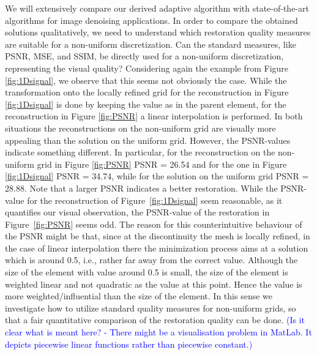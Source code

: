 \documentclass[enabledeprecatedfontcommands,cleardoublepage=empty,headsepline,twoside,11pt,DIV=15,BCOR=12mm,final]{scrartcl}
\begin{document}
We will extensively compare our derived adaptive algorithm with state-of-the-art algorithms for image denoising applications. In order to compare the obtained solutions qualitatively, we need to understand which restoration quality measures are suitable for a non-uniform discretization. Can the standard measures, like PSNR, MSE, and SSIM, be directly used for a non-uniform discretization, representing the visual quality? Considering again the example from Figure \ref{fig:1Dsignal}, we observe that this seems not obviously the case. While the transformation onto the locally refined grid for the reconstruction in Figure \ref{fig:1Dsignal} is done by keeping the value as in the parent element, for the reconstruction in Figure \ref{fig:PSNR} a linear interpolation is performed. In both situations the reconstructions on the non-uniform grid are visually more appealing than the solution on the uniform grid. However, the PSNR-values indicate something different. In particular, for the reconstruction on the non-uniform grid in Figure \ref{fig:PSNR} PSNR = 26.54 and for the one in Figure \ref{fig:1Dsignal} PSNR = 34.74, while for the solution on the uniform grid PSNR = 28.88. Note that a larger PSNR indicates a better restoration. While the PSNR-value for the reconstruction of Figure~\ref{fig:1Dsignal} seem reasonable, as it quantifies our visual observation, the PSNR-value of the restoration in Figure~\ref{fig:PSNR} seems odd. The reason for this counterintuitive behaviour of the PSNR might be that, since at the discontinuity the mesh is locally refined, in the case of linear interpolation there the minimization process aims at a solution which is around 0.5, i.e., rather far away from the correct value. Although the size of the element with value around 0.5 is small, the size of the element is weighted linear and not quadratic as the value at this point. Hence the value is more weighted/influential than the size of the element. In this sense we investigate how to utilize standard quality measures for non-uniform grids, so that a fair quantitative comparison of the restoration quality can be done. \textcolor{blue}{(Is it clear what is meant here? - There might be a visualisation problem in MatLab. It depicts piecewise linear functions rather than piecewise constant.)}
 
 
\end{document}
